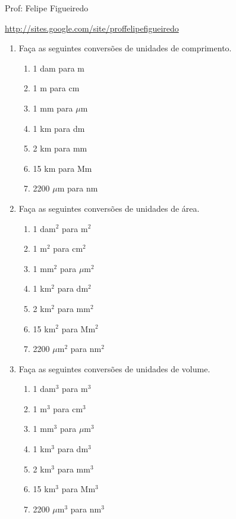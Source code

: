 \documentclass[a4paper]{article}
\begin{document}
\parbox[c]{.825\textwidth}{\raggedright%
{Prof: Felipe Figueiredo\par}
{\url{http://sites.google.com/site/proffelipefigueiredo}}

\vspace{1cm}
}


\begin{enumerate}
\item Faça as seguintes conversões de unidades de comprimento.
  \begin{enumerate}
  \item 1 dam para m
  \item 1 m para cm
  \item 1 mm para $\mu$m
  \item 1 km para dm
  \item 2 km para mm
  \item 15 km para Mm
  \item 2200 $\mu$m para nm
  \end{enumerate}
\item Faça as seguintes conversões de unidades de área.
  \begin{enumerate}
  \item 1 dam$^2$ para m$^2$
  \item 1 m$^2$ para cm$^2$
  \item 1 mm$^2$ para $\mu$m$^2$
  \item 1 km$^2$ para dm$^2$
  \item 2 km$^2$ para mm$^2$
  \item 15 km$^2$ para Mm$^2$
  \item 2200 $\mu$m$^2$ para nm$^2$
  \end{enumerate}

\item Faça as seguintes conversões de unidades de volume.
  \begin{enumerate}
  \item 1 dam$^3$ para m$^3$
  \item 1 m$^3$ para cm$^3$
  \item 1 mm$^3$ para $\mu$m$^3$
  \item 1 km$^3$ para dm$^3$
  \item 2 km$^3$ para mm$^3$
  \item 15 km$^3$ para Mm$^3$
  \item 2200 $\mu$m$^3$ para nm$^3$
  \end{enumerate}


\end{enumerate}
\end{document}
